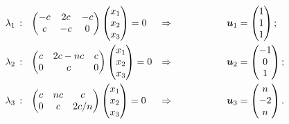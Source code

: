 \begin{align*}
    &\lambda_1 \, : \ \
    \begin{pmatrix}
        -c & 2c & -c \\
        c & -c & 0 \\
    \end{pmatrix}
    \begin{pmatrix}
        x_1 \\ x_2 \\ x_3
    \end{pmatrix} = 0
    &\Rightarrow \hspace{2cm}
    &\mbox{\boldmath $u$}_1 = \begin{pmatrix}
        1 \\ 1 \\ 1
    \end{pmatrix}; \\
    &\lambda_2 \, : \ \
    \begin{pmatrix}
        c & 2c-nc & c \\
        0 & c & 0 \\
    \end{pmatrix}
    \begin{pmatrix}
        x_1 \\ x_2 \\ x_3
    \end{pmatrix} = 0
    &\Rightarrow \hspace{2cm}
    &\mbox{\boldmath $u$}_2 = \begin{pmatrix}
        -1 \\ 0 \\ 1
    \end{pmatrix}; \\
    &\lambda_3 \, : \ \
    \begin{pmatrix}
        c & nc & c \\
        0 & c & 2c/n \\
    \end{pmatrix}
    \begin{pmatrix}
        x_1 \\ x_2 \\ x_3
    \end{pmatrix} = 0
    &\Rightarrow \hspace{2cm}
    &\mbox{\boldmath $u$}_3 = \begin{pmatrix}
        n \\ -2 \\ n
    \end{pmatrix}.
\end{align*}

